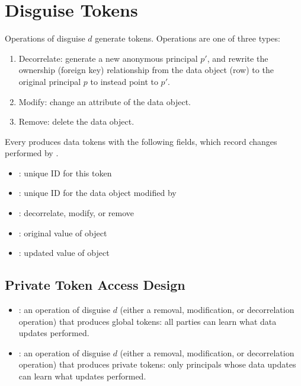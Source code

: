 \section{Disguise Tokens}

Operations  of disguise $d$ generate tokens. Operations are one of three types:
\begin{enumerate}
    \item Decorrelate: generate a new anonymous principal $p'$, and rewrite the ownership (foreign key)
        relationship from the data object (row) to the original principal $p$ to instead point to $p'$.
    \item Modify: change an attribute of the data object.
    \item Remove: delete the data object.
\end{enumerate}

\noindent
Every  produces data tokens  with the following fields, which record changes
performed by .
\begin{itemize}
\item {}:  unique ID for this token
\item {}:  unique ID for the data object modified by 
\item {}:  decorrelate, modify, or remove
\item {}:  original value of object 
\item {}:  updated value of object 
\end{itemize}


\subsection{Private Token Access Design}
\begin{itemize}
    \item {}: an operation of disguise $d$ (either a removal, modification, or decorrelation
    operation) that produces global tokens: all parties can learn what data updates 
    performed.
    \item {}: an operation of disguise $d$ (either a removal, modification, or decorrelation
    operation) that produces private tokens: only principals whose data  updates can learn
    what updates  performed.
\end{itemize}

